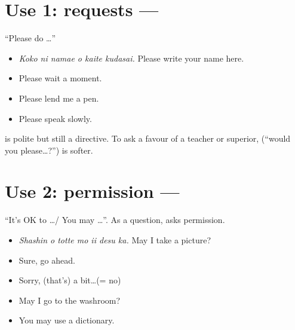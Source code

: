\section{Use 1: requests --- }
``Please do \ldots''
\begin{example}
\leavevmode
\begin{itemize}
  \item {} \emph{Koko ni namae o kaite kudasai.}
        Please write your name here.
  \item {} Please wait a moment.
  \item {} Please lend me a pen.
  \item {} Please speak slowly.
\end{itemize}
\end{example}
\begin{remark}
 is polite but still a directive. To ask a favour of a teacher or
superior,  (``would you please\ldots?'') is softer.
\end{remark}

\section{Use 2: permission --- }
``It's OK to \ldots / You may \ldots''. As a question,  asks
permission.
\begin{example}
\leavevmode
\begin{itemize}
  \item[Q:]  \emph{Shashin o totte mo ii desu ka.}
        May I take a picture?
  \item[A:]  Sure, go ahead.
  \item[A:]  Sorry, (that's) a bit\ldots (= no)
  \item {} May I go to the washroom?
  \item {} You may use a dictionary.
\end{itemize}
\end{example}

